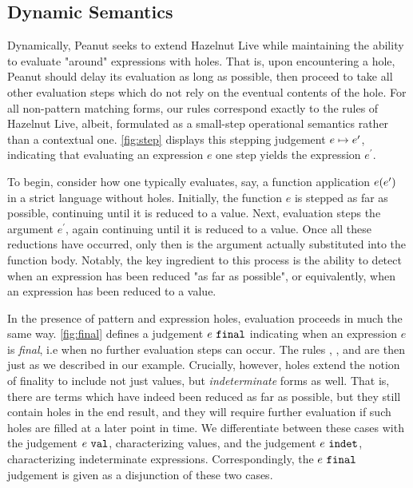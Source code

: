 \subsection{Dynamic Semantics}\label{sec:dynamics}




Dynamically, Peanut seeks to extend Hazelnut Live \cite{DBLP:journals/pacmpl/OmarVCH19} while maintaining the ability to evaluate "around" expressions with holes. That is, upon encountering a hole, Peanut should delay its evaluation as long as possible, then proceed to take all other evaluation steps which do not rely on the eventual contents of the hole. For all non-pattern matching forms, our rules correspond exactly to the rules of Hazelnut Live, albeit, formulated as a small-step operational semantics rather than a contextual one. \autoref{fig:step} displays this stepping judgement $e \mapsto e'$, indicating that evaluating an expression $e$ one step yields the expression $e^\prime$.

To begin, consider how one typically evaluates, say, a function application $e(e^\prime)$ in a strict language without holes. Initially, the function $e$ is stepped as far as possible, continuing until it is reduced to a value. Next, evaluation steps the argument $e^\prime$, again continuing until it is reduced to a value. Once all these reductions have occurred, only then is the argument actually substituted into the function body. Notably, the key ingredient to this process is the ability to detect when an expression has been reduced "as far as possible", or equivalently, when an expression has been reduced to a value. 

In the presence of pattern and expression holes, evaluation proceeds in much the same way. \autoref{fig:final} defines a judgement $e ~\mathtt{final}$ indicating when an expression $e$ is \emph{final}, i.e when no further evaluation steps can occur. The rules \ITApFun, \ITApArg, and \ITAp are then just as we described in our example. Crucially, however, holes extend the notion of finality to include not just values, but \emph{indeterminate} forms as well. That is, there are terms which have indeed been reduced as far as possible, but they still contain holes in the end result, and they will require further evaluation if such holes are filled at a later point in time. We differentiate between these cases with the judgement $e ~\mathtt{val}$, characterizing values, and the judgement $e ~\mathtt{indet}$, characterizing indeterminate expressions. Correspondingly, the $e ~\mathtt{final}$ judgement is given as a disjunction of these two cases.


